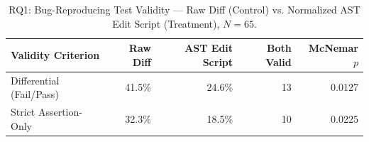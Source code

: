 \begin{table}[t]
\centering
\caption{RQ1: Bug-Reproducing Test Validity --- Raw Diff (Control) vs. Normalized AST Edit Script (Treatment), $N=65$.}
\label{tab:rq1_validity}
\begin{tabular}{lrrrr}
\toprule
Validity Criterion & Raw Diff & AST Edit Script & Both Valid & McNemar $p$ \\
\midrule
Differential (Fail/Pass) & 41.5\% & 24.6\% & 13 & 0.0127 \\
Strict Assertion-Only & 32.3\% & 18.5\% & 10 & 0.0225 \\
\bottomrule
\end{tabular}
\end{table}
